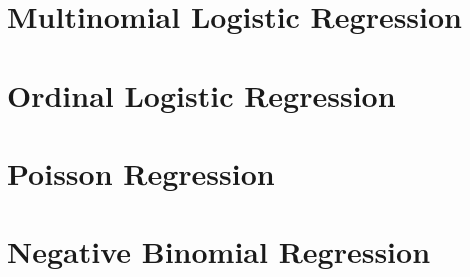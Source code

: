 \documentclass{beamer}
\begin{document}

\section{Multinomial Logistic Regression}



\section{Ordinal Logistic Regression}







\section{Poisson Regression}




\section{Negative Binomial Regression}




\end{document}
